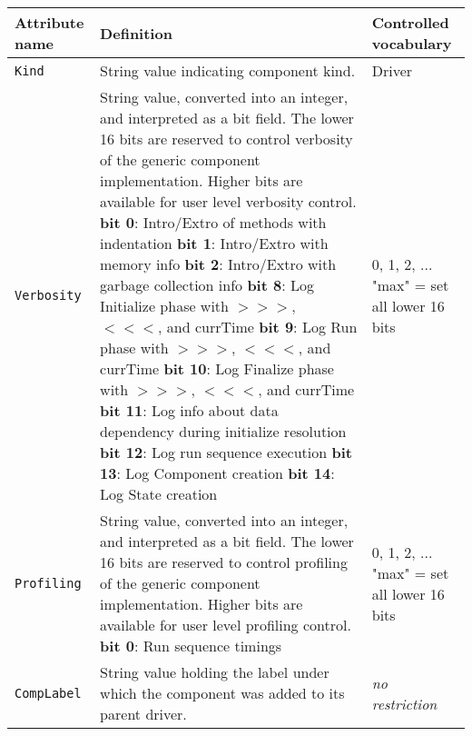 \begin{tabular}{|p{5cm}|p{5cm}|p{35mm}|}
     \hline\hline
     {\bf Attribute name} & {\bf Definition} & {\bf Controlled vocabulary}\\
     \hline\hline
     {\tt Kind} & String value indicating component kind.& Driver\\ \hline
     {\tt Verbosity} & String value, converted into an integer, and interpreted as a bit field. The lower 16 bits are reserved to control verbosity of the generic component implementation. Higher bits are available for user level verbosity control. \newline
                       {\bf bit 0}: Intro/Extro of methods with indentation\newline
                       {\bf bit 1}: Intro/Extro with memory info\newline
                       {\bf bit 2}: Intro/Extro with garbage collection info\newline
                       {\bf bit 8}: Log Initialize phase with $>>>$, $<<<$, and currTime\newline
                       {\bf bit 9}: Log Run phase with $>>>$, $<<<$, and currTime\newline
                       {\bf bit 10}: Log Finalize phase with $>>>$, $<<<$, and currTime\newline
                       {\bf bit 11}: Log info about data dependency during initialize resolution\newline
                       {\bf bit 12}: Log run sequence execution\newline
                       {\bf bit 13}: Log Component creation\newline
                       {\bf bit 14}: Log State creation
                     & 0, 1, 2, ... \newline
                       "max" = set all lower 16 bits\\ \hline
     {\tt Profiling} & String value, converted into an integer, and interpreted as a bit field. The lower 16 bits are reserved to control profiling of the generic component implementation. Higher bits are available for user level profiling control. \newline
                       {\bf bit 0}: Run sequence timings
                     & 0, 1, 2, ... \newline
                       "max" = set all lower 16 bits\\ \hline
     {\tt CompLabel} & String value holding the label under which the component was added to its parent driver.& {\em no restriction}\\ \hline

\end{tabular}
